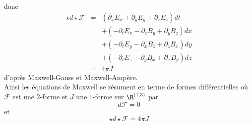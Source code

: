 donc 
\begin{eqnarray*}
\star d\star \mathscr{F} &=& (\partial_x E_x + \partial_y E_y + \partial_z E_z)dt \\
& & +(-\partial_t E_x - \partial_z B_y + \partial_y B_z) dx \\
& & +(-\partial_t E_y - \partial_x B_z + \partial_z B_x) dy \\
& & +(-\partial_t E_z - \partial_y B_x + \partial_x B_y) dz \\
&=& 4\pi J
\end{eqnarray*}
d'après Maxwell-Gauss et Maxwell-Ampère. \\

Ainsi les équations de Maxwell se résument en terme de formes différentielles où $\mathscr{F}$ est une $2$-forme et $J$ une $1$-forme sur $\R^{(1,3)}$ par 
$$d\mathscr{F} = 0$$
et
$$\star d\star \mathscr{F} = 4\pi J$$

